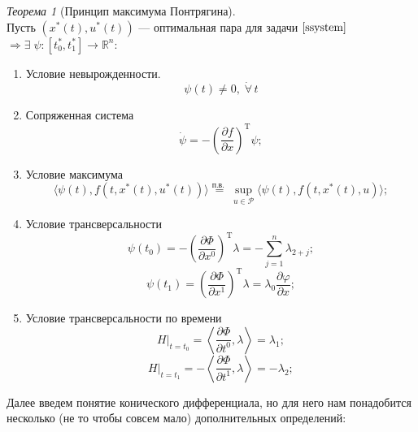 \documentclass[oneside, final, 14pt, draft]{article}
\theoremstyle{definition}
\theoremstyle{definition}
\theoremstyle{remark}
\theoremstyle{theorem}
\newtheorem{thm}{Теорема}[section]
\renewcommand{\phi}{\varphi}
\begin{document}
\begin{thm}[Принцип максимума Понтрягина] \ \\
Пусть $\left( x^*(t), u^*(t)\right)$ --- оптимальная пара для задачи $\eqref{ssystem}$ $\Rightarrow \exists\; \psi: \left[t_0^*, t_1^*\right] \rightarrow \mathbb{R}^n\colon$
\begin{enumerate}
\item Условие невырожденности.
$$\psi(t) \neq 0,\; \dot \forall\,t$$
\item Сопряженная система
\begin{equation*}
\dot{\psi} = -\left(\frac{\partial f}{\partial x}\right)^\mathrm{T} \psi;
\end{equation*}
\item Условие максимума
\begin{equation*}
\langle \psi(t), f(t, x^*(t), u^*(t))\rangle \stackrel{\text{п.в. }}{=} \sup\limits_{u \in \mathcal{P}}\langle \psi(t), f(t, x^*(t), u)\rangle;
\end{equation*}
\item Условие трансверсальности
\begin{equation*}
\psi (t_0) = -\left(\frac{\partial \Phi}{\partial x^0}\right)^\mathrm{T} \lambda = -\sum\limits_{j=1}^n \lambda_{2+j} ;
\end{equation*}
\begin{equation*}
\psi (t_1) = \left(\frac{\partial \Phi}{\partial x^1}\right)^\mathrm{T} \lambda = \lambda_0\frac{\partial \phi}{\partial x};
\end{equation*}
\item Условие трансверсальности по времени
\begin{equation*}
\left.H\right|_{t=t_0} = \left\langle \frac{\partial \Phi}{\partial t^0}, \lambda \right\rangle = \lambda_1;
\end{equation*}
\begin{equation*}
\left.H\right|_{t=t_1} = -\left\langle \frac{\partial \Phi}{\partial t^1}, \lambda \right\rangle = -\lambda_2;
\end{equation*}
\end{enumerate}
\end{thm}
{\flushleft Далее введем понятие конического дифференциала, но для него нам понадобится несколько (не то чтобы совсем мало) дополнительных определений:}
\end{document}
